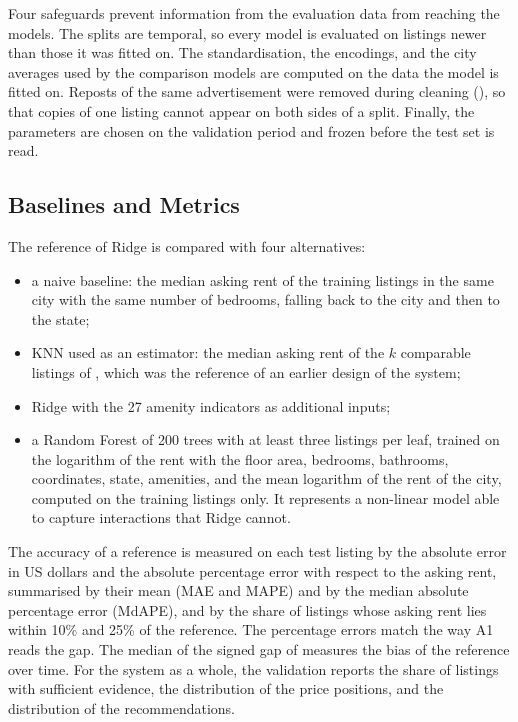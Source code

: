 \documentclass[12pt,a4paper]{report}
\begin{document}
Four safeguards prevent information from the evaluation data from reaching
the models. The splits are temporal, so every model is evaluated on listings
newer than those it was fitted on. The standardisation, the encodings, and
the city averages used by the comparison models are computed on the data the
model is fitted on. Reposts of the same advertisement were removed during
cleaning (), so that copies of one listing cannot
appear on both sides of a split. Finally, the parameters are chosen on the
validation period and frozen before the test set is read.

\subsection{Baselines and Metrics}

The reference of Ridge is compared with four alternatives:

\begin{itemize}[leftmargin=*]
  \item a naive baseline: the median asking rent of the training listings in
  the same city with the same number of bedrooms, falling back to the city
  and then to the state;
  \item KNN used as an estimator: the median asking rent of the $k$
  comparable listings of , which was the reference of an
  earlier design of the system;
  \item Ridge with the 27 amenity indicators as additional inputs;
  \item a Random Forest of 200 trees with at least three listings per leaf,
  trained on the logarithm of the rent with the floor area, bedrooms,
  bathrooms, coordinates, state, amenities, and the mean logarithm of the
  rent of the city, computed on the training listings only. It represents a
  non-linear model able to capture interactions that Ridge cannot.
\end{itemize}

The accuracy of a reference is measured on each test listing by the
absolute error in US dollars and the absolute percentage error with respect
to the asking rent, summarised by their mean (MAE and MAPE) and by the
median absolute percentage error (MdAPE), and by the share of listings
whose asking rent lies within 10\% and 25\% of the reference. The
percentage errors match the way A1 reads the gap. The median of the signed
gap of  measures the bias of the reference over time. For the
system as a whole, the validation reports the share of listings with
sufficient evidence, the distribution of the price positions, and the
distribution of the recommendations.
\end{document}
